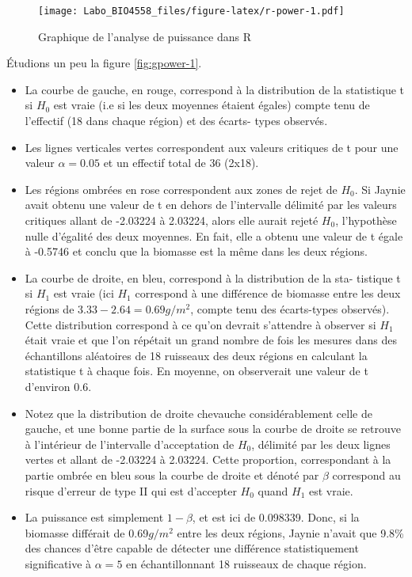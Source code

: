 \documentclass[
  12pt,
]{book}
\providecommand{\tightlist}{%
  \setlength{\itemsep}{0pt}\setlength{\parskip}{0pt}}
\begin{document}
\begin{figure}
\centering
\texttt{[image: Labo\_BIO4558\_files/figure-latex/r-power-1.pdf]}
\caption{\label{fig:r-power}Graphique de l'analyse de puissance dans R}
\end{figure}

Étudions un peu la figure \ref{fig:gpower-1}.

\begin{itemize}
\tightlist
\item
  La courbe de gauche, en rouge, correspond à la distribution de la statistique t si \(H_0\) est vraie (i.e si les deux moyennes étaient égales) compte tenu de l'effectif (18 dans chaque région) et des écarts- types observés.
\item
  Les lignes verticales vertes correspondent aux valeurs critiques de t pour une valeur \(\alpha = 0.05\) et un effectif total de 36 (2x18).
\item
  Les régions ombrées en rose correspondent aux zones de rejet de \(H_0\).
  Si Jaynie avait obtenu une valeur de t en dehors de l'intervalle délimité par les valeurs critiques allant de -2.03224 à 2.03224, alors elle aurait rejeté \(H_0\), l'hypothèse nulle d'égalité des deux moyennes.
  En fait, elle a obtenu une valeur de t égale à -0.5746 et conclu que la biomasse est la même dans les deux régions.
\item
  La courbe de droite, en bleu, correspond à la distribution de la sta- tistique t si \(H_1\) est vraie (ici \(H_1\) correspond à une différence de biomasse entre les deux régions de \(3.33-2.64=0.69g/m^2\), compte tenu des écarts-types observés).
  Cette distribution correspond à ce qu'on devrait s'attendre à observer si \(H_1\) était vraie et que l'on répétait un grand nombre de fois les mesures dans des échantillons aléatoires de 18 ruisseaux des deux régions en calculant la statistique t à chaque fois.
  En moyenne, on observerait une valeur de t d'environ 0.6.
\item
  Notez que la distribution de droite chevauche considérablement celle de gauche, et une bonne partie de la surface sous la courbe de droite se retrouve à l'intérieur de l'intervalle d'acceptation de \(H_0\), délimité par les deux lignes vertes et allant de -2.03224 à 2.03224.
  Cette proportion, correspondant à la partie ombrée en bleu sous la courbe de droite et dénoté par \(\beta\) correspond au risque d'erreur de type II qui est d'accepter \(H_0\) quand \(H_1\) est vraie.
\item
  La puissance est simplement \(1-\beta\), et est ici de 0.098339.
  Donc, si la biomasse différait de 0.69\(g/m^2\) entre les deux régions, Jaynie n'avait que 9.8\% des chances d'être capable de détecter une différence statistiquement significative à \(\alpha=5%
  \) en échantillonnant 18 ruisseaux de chaque région.
\end{itemize}
\end{document}
